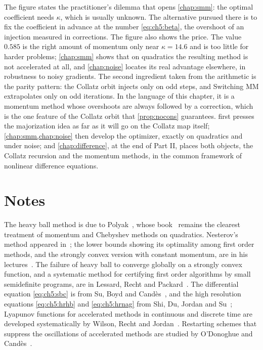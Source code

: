 The figure states the practitioner's dilemma that opens \cref{chap:smm}: the
optimal coefficient needs $\kappa$, which is usually unknown.  The alternative
pursued there is to fix the coefficient in advance at the number
\eqref{eq:ch5:beta}, the overshoot of an injection measured in corrections.
The figure also shows the price.  The value $0.585$ is the
right amount of momentum only near $\kappa=14.6$ and is too little for harder
problems; \cref{chap:smm} shows that on quadratics the resulting method is not
accelerated at all, and \cref{chap:noise} locates its real advantage
elsewhere, in robustness to noisy gradients.  The second ingredient taken from
the arithmetic is the parity pattern: the Collatz orbit injects only on odd
steps, and Switching MM extrapolates only on odd iterations.  In the language
of this chapter, it is a momentum method whose overshoots are always followed
by a correction, which is the one feature of the Collatz orbit that
\cref{prop:nocons} guarantees.
 first presses the majorization idea as far as it will go on the Collatz map itself; \cref{chap:smm,chap:noise} then develop the optimizer, exactly on quadratics and under noise; and \cref{chap:difference}, at the end of Part II, places both objects, the Collatz recursion and the momentum methods, in the common framework of nonlinear difference equations.

\section*{Notes}

The heavy ball method is due to Polyak~\cite{polyak1964}, whose
book~\cite{polyak1987} remains the clearest treatment of momentum and
Chebyshev methods on quadratics.  Nesterov's method appeared
in~\cite{nesterov1983}; the lower bounds showing its optimality among first
order methods, and the strongly convex version with constant momentum, are in
his lectures~\cite{nesterov2004}.  The failure of heavy ball to converge
globally on a strongly convex function, and a systematic method for certifying
first order algorithms by small semidefinite programs, are in Lessard, Recht
and Packard~\cite{lessard2016}.  The differential equation
\eqref{eq:ch5:sbc} is from Su, Boyd and Cand\`es~\cite{su2016}, and the high
resolution equations \eqref{eq:ch5:hrhb} and \eqref{eq:ch5:hrnag} from Shi, Du,
Jordan and Su~\cite{shi2022}; Lyapunov functions for accelerated methods in
continuous and discrete time are developed systematically by Wilson, Recht and
Jordan~\cite{wilson2021}.  Restarting schemes that suppress the oscillations
of accelerated methods are studied by O'Donoghue and
Cand\`es~\cite{odonoghue2015}.

